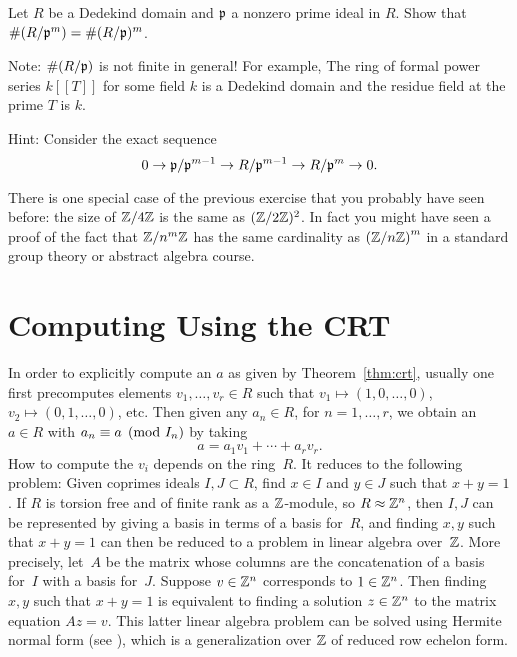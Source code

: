 \begin{exercise}\label{ex:residuefieldofpower}
	Let $R$ be a Dedekind domain and $\mathfrak{p}$ a nonzero prime ideal in $R$.
	Show that $\#(R/\mathfrak{p}^m) = \#(R/\mathfrak{p})^m$.
	
	Note: $\#(R/\mathfrak{p})$ is not finite in general! For example,
	The ring of formal power series $k[[T]]$ for some field $k$
	is a Dedekind domain and the residue field at the prime $T$
	is $k$.
	
	Hint: Consider the exact sequence
	$$
	0\to \mathfrak{p}/\mathfrak{p}^{m-1} \to R/\mathfrak{p}^{m-1} \to R/\mathfrak{p}^m \to 0.
	$$
\end{exercise}

\begin{remark}
	There is one special case of the previous exercise that you probably
	have seen before: the size of $\mathbb{Z}/4\mathbb{Z}$ is the same as
	$(\mathbb{Z}/2\mathbb{Z})^2$. In fact you might have seen a proof of
	the fact that $\mathbb{Z}/n^m\mathbb{Z}$ has the same cardinality as $\left(\mathbb{Z}/n\mathbb{Z}\right)^m$
	in a standard group theory or abstract algebra course.
\end{remark}

\section{Computing Using the CRT}
In order to explicitly compute an $a$ as given by Theorem~\ref{thm:crt},
usually one first precomputes elements $v_1, \ldots, v_r \in R$ such that
$v_1\mapsto (1,0,\ldots, 0)$, 
$v_2\mapsto (0,1,\ldots, 0)$, etc.
Then given any $a_n \in R$, for $n=1,\ldots, r$, we obtain an $a \in R$
with $a_n\equiv a\pmod{I_n}$ by taking
$$
  a = a_1 v_1 + \cdots + a_r v_r.
$$
How to compute the $v_i$ depends on the ring~$R$.   It reduces to
the following problem: Given coprimes ideals $I,J\subset R$, find
$x\in I$ and $y\in J$ such that $x+y=1$.   If $R$ is torsion free and
of finite rank 
as a $\mathbb{Z}$-module, so $R\approx \mathbb{Z}^n$,
then $I, J$ can be represented by giving a basis in terms of a basis
for~$R$, and finding $x,y$ such  that $x+y=1$ can then be reduced to 
a problem in linear algebra over~$\mathbb{Z}$.  
More precisely, let~$A$
be the matrix whose columns are the concatenation of a basis for~$I$
with a basis for~$J$.  
Suppose $v\in \mathbb{Z}^n$ corresponds to $1\in\mathbb{Z}^n$.
Then finding $x,y$ such that $x+y=1$ is equivalent to
finding a solution $z\in \mathbb{Z}^n$ to the matrix equation
$Az = v$. This latter linear algebra problem
can be solved using Hermite normal form 
(see \cite[\S4.7.1]{cohen:course_ant}),
which is a generalization over $\mathbb{Z}$
of reduced row echelon form.

